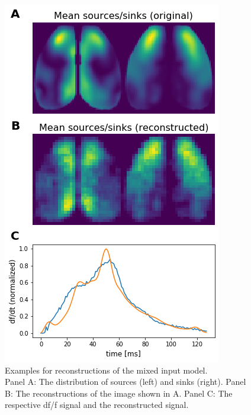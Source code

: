 \begin{figure}[!htb]
\centering
\includegraphics[width=\textwidth,height=\textheight,keepaspectratio]{Figures/reconstructions_example_mixed_input}
\decoRule
\caption[Examples for reconstructions of the mixed input model]{Examples for reconstructions of the mixed input model.\\ Panel A: The distribution of sources (left) and sinks (right). Panel B: The reconstructions of the image shown in A. Panel C: The respective df/f signal and the reconstructed signal.}
\label{fig:reconstructions_example_mixed_input}
\end{figure}

